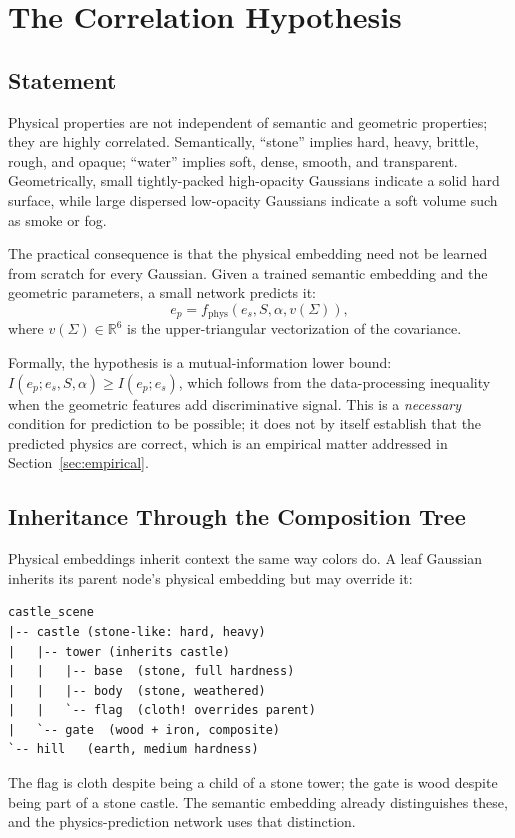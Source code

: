 \documentclass[twoside,11pt]{article}
\begin{document}
\section{The Correlation Hypothesis}
\label{sec:correlation}

\subsection{Statement}

Physical properties are not independent of semantic and geometric properties; they are highly correlated. Semantically, ``stone'' implies hard, heavy, brittle, rough, and opaque; ``water'' implies soft, dense, smooth, and transparent. Geometrically, small tightly-packed high-opacity Gaussians indicate a solid hard surface, while large dispersed low-opacity Gaussians indicate a soft volume such as smoke or fog.

The practical consequence is that the physical embedding need not be learned from scratch for every Gaussian. Given a trained semantic embedding and the geometric parameters, a small network predicts it:
\begin{equation}
\label{eq:fphys}
e_p = f_{\text{phys}}(e_s, S, \alpha, v(\Sigma)),
\end{equation}
where $v(\Sigma) \in \mathbb{R}^6$ is the upper-triangular vectorization of the covariance.

Formally, the hypothesis is a mutual-information lower bound: $I(e_p ; e_s, S, \alpha) \ge I(e_p ; e_s)$, which follows from the data-processing inequality when the geometric features add discriminative signal. This is a \emph{necessary} condition for prediction to be possible; it does not by itself establish that the predicted physics are correct, which is an empirical matter addressed in Section~\ref{sec:empirical}.

\subsection{Inheritance Through the Composition Tree}

Physical embeddings inherit context the same way colors do. A leaf Gaussian inherits its parent node's physical embedding but may override it:
\begin{verbatim}
castle_scene
|-- castle (stone-like: hard, heavy)
|   |-- tower (inherits castle)
|   |   |-- base  (stone, full hardness)
|   |   |-- body  (stone, weathered)
|   |   `-- flag  (cloth! overrides parent)
|   `-- gate  (wood + iron, composite)
`-- hill   (earth, medium hardness)
\end{verbatim}
The flag is cloth despite being a child of a stone tower; the gate is wood despite being part of a stone castle. The semantic embedding already distinguishes these, and the physics-prediction network uses that distinction.
\end{document}
